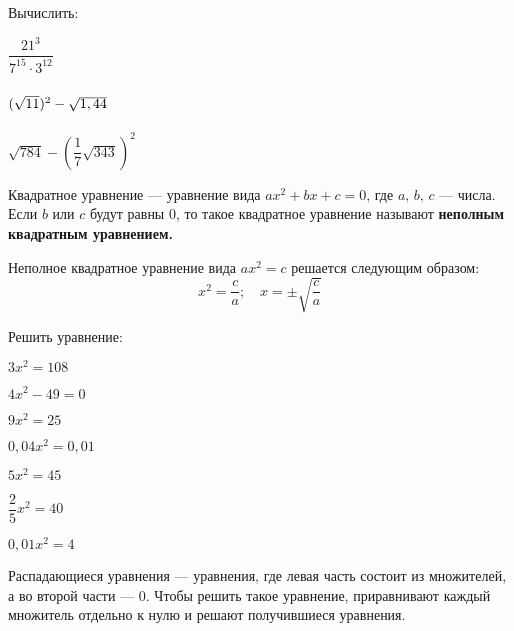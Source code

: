 \begin{class}[number=5]
	\begin{listofex}
		\item Вычислить:
		\begin{enumcols}[itemcolumns=3]
			\item \( \dfrac{21^3}{7^{15}\cdot3^{12}} \)
			\item \( \vphantom{\dfrac{1^1}{1^1}}(\sqrt{11})^2-\sqrt{1,44} \)
			\item \( \sqrt{784}-\left( \dfrac{1}{7}\sqrt{343} \right)^2 \)
		\end{enumcols}
	\end{listofex}
	\begin{definit}
		Квадратное уравнение --- уравнение вида \( ax^2+bx+c=0 \), где \( a,\, b,\, c \) --- числа. Если \( b \) или \( c \) будут равны 0, то такое квадратное уравнение называют \textbf{неполным квадратным уравнением.}
	\end{definit}
	\begin{definit}
		Неполное квадратное уравнение вида \( ax^2=c \) решается следующим образом:
		\[ x^2=\dfrac{c}{a};\quad x=\pm\sqrt{\dfrac{c}{a}} \]
	\end{definit}
	\begin{listofex}[resume]
		\item Решить уравнение:
		\begin{enumcols}[itemcolumns=4]
			\item \exercise{386}
			\item \exercise{387}
			\item \exercise{388}
			\item \exercise{390}
			\item \( 3x^2=108 \)
			\item \( 4x^2-49=0 \)
			\item \( 9x^2=25 \)
			\item \( 0,04x^2=0,01 \)
			\item \( 5x^2=45 \)
			\item \( \dfrac{2}{5}x^2=40 \)
			\item \( 0,01x^2=4 \)
		\end{enumcols}
	\end{listofex}
	\begin{definit}
	Распадающиеся уравнения --- уравнения, где левая часть состоит из множителей, а во второй части --- \( 0 \). Чтобы решить такое уравнение, приравнивают каждый множитель отдельно к нулю и решают получившиеся уравнения.
	\begin{center}

\end{center}
\end{definit}
\end{class}
